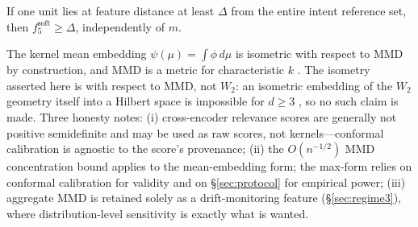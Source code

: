 \begin{proposition}
\label{prop:unit-sens}
If one unit lies at feature distance at least $\Delta$ from the entire intent
reference set, then $f_5^{\mathrm{soft}}\ge\Delta$, independently of $m$.
\end{proposition}

The kernel mean embedding $\psi(\mu)=\int\phi\,d\mu$ is isometric with respect
to MMD by construction, and MMD is a metric for characteristic $k$
\cite{gretton2012}. The isometry asserted here is with respect to MMD, not
$W_2$: an isometric embedding of the $W_2$ geometry itself into a Hilbert
space is impossible for $d\ge 3$ \cite{andoni2018}, so no such claim is made.
Three honesty notes: (i) cross-encoder relevance scores are generally not
positive semidefinite and may be used as raw scores, not kernels---conformal
calibration is agnostic to the score's provenance; (ii) the $O(n^{-1/2})$ MMD
concentration bound applies to the mean-embedding form; the max-form relies on
conformal calibration for validity and on \S\ref{sec:protocol} for empirical
power; (iii) aggregate MMD is retained solely as a drift-monitoring feature
(\S\ref{sec:regime3}), where distribution-level sensitivity is exactly what is
wanted.
